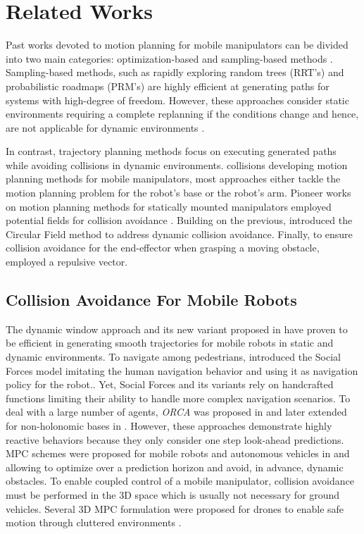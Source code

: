 \section{Related Works}%
\label{sec:related_works}

Past works devoted to motion planning for mobile manipulators can be divided
into two main categories: optimization-based and sampling-based methods
\cite{LaValle2006,Mukadam2017}. Sampling-based methods, such as rapidly
exploring random trees (RRT's) \cite{Webb2013,Kleinbort2019,Kuffner2000} and
probabilistic roadmaps (PRM's) \cite{Hsu2002,Faust2017} are highly efficient at
generating paths for systems with high-degree of freedom. However, these
approaches consider static environments requiring a complete replanning if the
conditions change and hence, are not applicable for dynamic environments
\cite{Avanzini2018}.

In contrast, trajectory planning methods focus on executing generated paths
while avoiding collisions in dynamic environments. collisions developing motion
planning methods for mobile manipulators, most approaches either tackle the
motion planning problem for the robot's base or the robot's arm. Pioneer works
on motion planning methods for statically mounted manipulators employed
potential fields for collision avoidance \cite{Khatib1985}. Building on the
previous, \cite{Haddadin2011} introduced the Circular Field method to address
dynamic collision avoidance. Finally, to ensure collision avoidance for the
end-effector when grasping a moving obstacle, \cite{Du2018} employed a
repulsive vector.

\subsection{Collision Avoidance For Mobile Robots}
The dynamic window approach \cite{Fox1997} and its new variant proposed in
\cite{Zhang2019} have proven to be efficient in generating smooth trajectories
for mobile robots in static and dynamic environments. To navigate among
pedestrians, \cite{Ferrer2013} introduced the Social Forces model imitating
the human navigation behavior and using it as navigation policy for the
robot..  Yet, Social Forces and its variants rely on handcrafted functions
limiting their ability to handle more complex navigation scenarios. To deal
with a large number of agents, \textit{ORCA} was proposed in
\cite{VanDenBerg2011} and later extended for non-holonomic bases in
\cite{Alonso-Mora2012a}. However, these approaches demonstrate highly reactive
behaviors because they only consider one step look-ahead predictions. MPC
schemes were proposed for mobile robots and autonomous vehicles in
\cite{Brito2019} and \cite{Schwarting2018} allowing to optimize over a
prediction horizon and avoid, in advance, dynamic obstacles. To enable coupled
control of a mobile manipulator, collision avoidance must be performed in the
3D space which is usually not necessary for ground vehicles. Several 3D MPC
formulation were proposed for drones to enable safe motion through cluttered
environments \cite{Tordesillas2019,Liu2017}.


